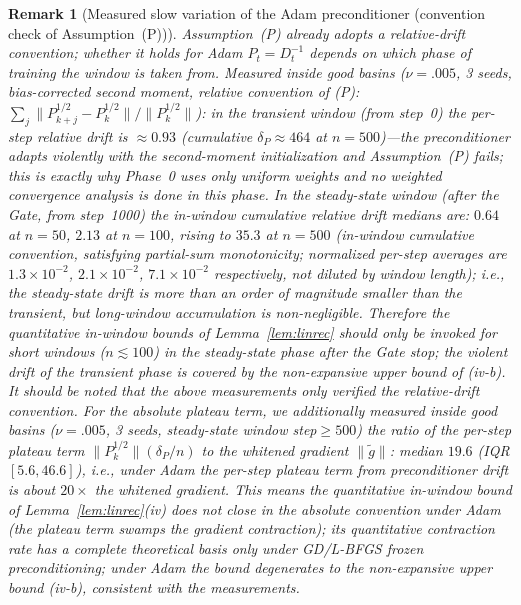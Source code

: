 \documentclass[11pt]{article}
\newcommand{\wt}[1]{\widetilde{#1}}
\newtheorem*{remark}{Remark}
\numberwithin{equation}{section}
\begin{document}
\begin{remark}[Measured slow variation of the Adam preconditioner (convention check of Assumption~(P))]\label{rem:adam-drift}
Assumption~(P) already adopts a relative-drift convention; whether it holds for Adam $P_t=D_t^{-1}$ depends on which phase of training the window is taken from. Measured inside good basins ($\nu=.005$, 3 seeds, bias-corrected second moment, relative convention of (P): $\sum_j\|P_{k+j}^{1/2}-P_k^{1/2}\|/\|P_k^{1/2}\|$): in the \emph{transient window} (from step~0) the per-step relative drift is $\approx0.93$ (cumulative $\delta_P\approx464$ at $n=500$)---the preconditioner adapts violently with the second-moment initialization and Assumption~(P) fails; this is exactly why Phase~0 uses only uniform weights and no weighted convergence analysis is done in this phase. In the \emph{steady-state window} (after the Gate, from step~1000) the in-window cumulative relative drift medians are: $0.64$ at $n=50$, $2.13$ at $n=100$, rising to $35.3$ at $n=500$ (in-window cumulative convention, satisfying partial-sum monotonicity; normalized per-step averages are $1.3\times10^{-2}$, $2.1\times10^{-2}$, $7.1\times10^{-2}$ respectively, not diluted by window length); i.e., the steady-state drift is more than an order of magnitude smaller than the transient, but long-window accumulation is non-negligible. Therefore the quantitative in-window bounds of Lemma~\ref{lem:linrec} should only be invoked for short windows ($n\lesssim100$) in the steady-state phase after the Gate stop; the violent drift of the transient phase is covered by the non-expansive upper bound of (iv-b). It should be noted that the above measurements only verified the \emph{relative}-drift convention. For the \emph{absolute} plateau term, we additionally measured inside good basins ($\nu=.005$, 3 seeds, steady-state window step$\ge500$) the ratio of the per-step plateau term $\|P_k^{1/2}\|(\delta_P/n)$ to the whitened gradient $\|\wt g\|$: median $19.6$ (IQR $[5.6,46.6]$), i.e., under Adam the per-step plateau term from preconditioner drift is about $20\times$ the whitened gradient. This means the quantitative in-window bound of Lemma~\ref{lem:linrec}(iv) \emph{does not close in the absolute convention under Adam} (the plateau term swamps the gradient contraction); its quantitative contraction rate has a complete theoretical basis only under GD/L-BFGS frozen preconditioning; under Adam the bound degenerates to the non-expansive upper bound (iv-b), consistent with the measurements.
\end{remark}
\end{document}
